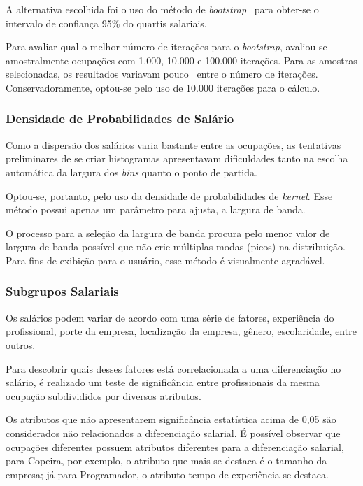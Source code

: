 \documentclass[12pt,a4paper]{article}
\begin{document}
A alternativa escolhida foi o uso do método de \textit{bootstrap}~ para obter-se o intervalo de confiança 95\% do quartis salariais.

Para avaliar qual o melhor número de iterações para o \textit{bootstrap}, avaliou-se amostralmente ocupações com 1.000, 10.000 e 100.000 iterações. Para as amostras selecionadas, os resultados variavam pouco~ entre o número de iterações. Conservadoramente, optou-se pelo uso de 10.000 iterações para o cálculo.

\subsubsection{Densidade de Probabilidades de Salário} \label{sec:kde-salario}

Como a dispersão dos salários varia bastante entre as ocupações, as tentativas preliminares de se criar histogramas apresentavam dificuldades tanto na escolha automática da largura dos \textit{bins} quanto o ponto de partida.

Optou-se, portanto, pelo uso da densidade de probabilidades de \textit{kernel}. Esse método possui apenas um parâmetro para ajusta, a largura de banda.

O processo para a seleção da largura de banda procura pelo menor valor de largura de banda possível que não crie múltiplas modas (picos) na distribuição. Para fins de exibição para o usuário, esse método é visualmente agradável.

\subsubsection{Subgrupos Salariais} \label{sec:atributo-salarial}


Os salários podem variar de acordo com uma série de fatores, experiência do profissional, porte da empresa, localização da empresa, gênero, escolaridade, entre outros.

Para descobrir quais desses fatores está correlacionada a uma diferenciação no salário, é realizado um teste de significância entre profissionais da mesma ocupação subdivididos por diversos atributos.

Os atributos que não apresentarem significância estatística acima de 0,05 são considerados não relacionados a diferenciação salarial. É possível observar que ocupações diferentes possuem atributos diferentes para a diferenciação salarial, para Copeira, por exemplo, o atributo que mais se destaca é o tamanho da empresa; já para Programador, o atributo tempo de experiência se destaca.
\end{document}
